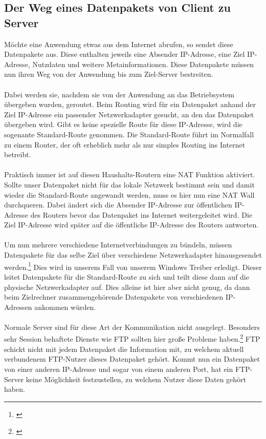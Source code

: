 \subsection{Der Weg eines Datenpakets von Client zu Server}
Möchte eine Anwendung etwas aus dem Internet abrufen, so sendet diese Datenpakete aus. Diese enthalten jeweils eine Absender IP-Adresse, eine Ziel IP-Adresse, Nutzdaten und weitere Metainformationen. Diese Datenpakete müssen nun ihren Weg von der Anwendung bis zum Ziel-Server bestreiten. 
\\\\
Dabei werden sie, nachdem sie von der Anwendung an das Betriebsystem übergeben wurden, geroutet. Beim Routing wird für ein Datenpaket anhand der Ziel IP-Adresse ein passender Netzwerkadapter gesucht, an den das Datenpaket übergeben wird. Gibt es keine spezielle Route für diese IP-Adresse, wird die sogenante Standard-Route genommen. Die Standard-Route führt im Normalfall zu einem Router, der oft erheblich mehr als nur simples Routing ins Internet betreibt. 
\\\\
Praktisch immer ist auf diesen Haushalts-Routern eine NAT Funktion aktiviert. Sollte unser Datenpaket nicht für das lokale Netzwerk bestimmt sein und damit wieder die Standard-Route angewandt werden, muss es hier nun eine NAT Wall durchqueren. Dabei ändert sich die Absender IP-Adresse zur öffentlichen IP-Adresse des Routers bevor das Datenpaket ins Internet weitergeleitet wird. Die Ziel IP-Adresse wird später auf die öffentliche IP-Adresse des Routers antworten.
\\\\
Um nun mehrere verschiedene Internetverbindungen zu bündeln, müssen  Datenpakete für das selbe Ziel über verschiedene Netzwerkadapter hinausgesendet werden.\footnote[1]{\cite[Vgl.][]{WANB}} Dies wird in unserem Fall von unserem Windows Treiber erledigt. Dieser leitet Datenpakete für die Standard-Route zu sich und teilt diese dann auf die physische Netzwerkadapter auf. Dies alleine ist hier aber nicht genug, da dann beim Zielrechner zusammengehörende Datenpakete von verschiedenen IP-Adressen ankommen würden. 
\\\\
Normale Server sind für diese Art der Kommunikation nicht ausgelegt. Besonders sehr Session behaftete Dienste wie FTP sollten hier große Probleme haben.\footnote[2]{\cite[Vgl.][]{SRV4}} FTP schickt nicht mit jedem Datenpaket die Information mit, zu welchem aktuell verbundenem FTP-Nutzer dieses Datenpaket gehört. Kommt nun ein Datenpaket von einer anderen IP-Adresse und sogar von einem anderen Port, hat ein FTP-Server keine Möglichkeit festzustellen, zu welchem Nutzer diese Daten gehört haben. 
